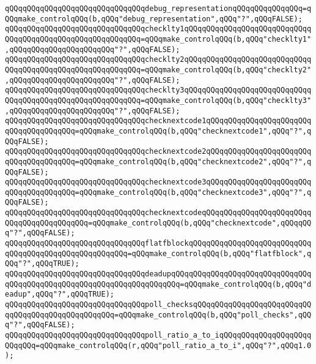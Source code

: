 \newline
\verb|qQQqqQQqqQQqqQQqqQQqqQQqqQQqqQQqdebug_representationqQQqqQQqqQQqqQQq=qQQqmake_controlqQQq(b,qQQq"debug_representation",qQQq"?",qQQqFALSE);|\newline
\newline
\verb|qQQqqQQqqQQqqQQqqQQqqQQqqQQqqQQqchecklty1qQQqqQQqqQQqqQQqqQQqqQQqqQQqqQQqqQQqqQQqqQQqqQQqqQQqqQQqqQQq=qQQqmake_controlqQQq(b,qQQq"checklty1",qQQqqQQqqQQqqQQqqQQqqQQq"?",qQQqFALSE);|\newline
\verb|qQQqqQQqqQQqqQQqqQQqqQQqqQQqqQQqchecklty2qQQqqQQqqQQqqQQqqQQqqQQqqQQqqQQqqQQqqQQqqQQqqQQqqQQqqQQqqQQq=qQQqmake_controlqQQq(b,qQQq"checklty2",qQQqqQQqqQQqqQQqqQQqqQQq"?",qQQqFALSE);|\newline
\verb|qQQqqQQqqQQqqQQqqQQqqQQqqQQqqQQqchecklty3qQQqqQQqqQQqqQQqqQQqqQQqqQQqqQQqqQQqqQQqqQQqqQQqqQQqqQQqqQQq=qQQqmake_controlqQQq(b,qQQq"checklty3",qQQqqQQqqQQqqQQqqQQqqQQq"?",qQQqFALSE);|\newline
\verb|qQQqqQQqqQQqqQQqqQQqqQQqqQQqqQQqchecknextcode1qQQqqQQqqQQqqQQqqQQqqQQqqQQqqQQqqQQqqQQq=qQQqmake_controlqQQq(b,qQQq"checknextcode1",qQQq"?",qQQqFALSE);|\newline
\verb|qQQqqQQqqQQqqQQqqQQqqQQqqQQqqQQqchecknextcode2qQQqqQQqqQQqqQQqqQQqqQQqqQQqqQQqqQQqqQQq=qQQqmake_controlqQQq(b,qQQq"checknextcode2",qQQq"?",qQQqFALSE);|\newline
\verb|qQQqqQQqqQQqqQQqqQQqqQQqqQQqqQQqchecknextcode3qQQqqQQqqQQqqQQqqQQqqQQqqQQqqQQqqQQqqQQq=qQQqmake_controlqQQq(b,qQQq"checknextcode3",qQQq"?",qQQqFALSE);|\newline
\verb|qQQqqQQqqQQqqQQqqQQqqQQqqQQqqQQqchecknextcodeqQQqqQQqqQQqqQQqqQQqqQQqqQQqqQQqqQQqqQQqqQQq=qQQqmake_controlqQQq(b,qQQq"checknextcode",qQQqqQQq"?",qQQqFALSE);|\newline
\newline
\verb|qQQqqQQqqQQqqQQqqQQqqQQqqQQqqQQqflatfblockqQQqqQQqqQQqqQQqqQQqqQQqqQQqqQQqqQQqqQQqqQQqqQQqqQQqqQQq=qQQqmake_controlqQQq(b,qQQq"flatfblock",qQQq"?",qQQqTRUE);|\newline
\verb|qQQqqQQqqQQqqQQqqQQqqQQqqQQqqQQqdeadupqQQqqQQqqQQqqQQqqQQqqQQqqQQqqQQqqQQqqQQqqQQqqQQqqQQqqQQqqQQqqQQqqQQqqQQq=qQQqmake_controlqQQq(b,qQQq"deadup",qQQq"?",qQQqTRUE);|\newline
\newline
\verb|qQQqqQQqqQQqqQQqqQQqqQQqqQQqqQQqpoll_checksqQQqqQQqqQQqqQQqqQQqqQQqqQQqqQQqqQQqqQQqqQQqqQQqqQQq=qQQqmake_controlqQQq(b,qQQq"poll_checks",qQQq"?",qQQqFALSE);|\newline
\verb|qQQqqQQqqQQqqQQqqQQqqQQqqQQqqQQqpoll_ratio_a_to_iqQQqqQQqqQQqqQQqqQQqqQQqqQQq=qQQqmake_controlqQQq(r,qQQq"poll_ratio_a_to_i",qQQq"?",qQQq1.0);|\newline
